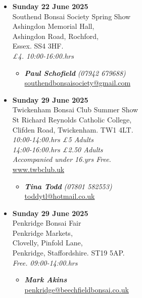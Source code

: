 \begin{itemize}
    \item \textbf{Sunday 22 June 2025}
    \\
    Southend Bonsai Society Spring Show \\
    Ashingdon Memorial Hall, \\
    Ashingdon Road, Rochford, \\
    Essex. SS4 3HF.
    \\
    \emph{£4. 10:00-16:00.hrs}
    \begin{itemize}
        \item \textbf{\emph{Paul Schofield}} \emph{(07942 679688)} \\
        \href{mailto:southendbonsaisociety@gmail.com}{southendbonsaisociety@gmail.com} 
    \end{itemize}

    \item \textbf{Sunday 29 June 2025}
    \\
    Twickenham Bonsai Club Summer Show \\
    St Richard Reynolds Catholic College, \\
    Clifden Road, Twickenham. TW1 4LT.
    \\
    \emph{10:00-14:00.hrs £5 Adults} \\
    \emph{14:00-16:00.hrs £2.50 Adults} \\
    \emph{Accompanied under 16.yrs Free.}
    \\
    \href{https://www.twbclub.uk}{www.twbclub.uk}
    \begin{itemize}
        \item \textbf{\emph{Tina Todd}} \emph{(07801 582553)} \\
        \href{mailto:toddytl@hotmail.co.uk}{toddytl@hotmail.co.uk} 
    \end{itemize}

    \item \textbf{Sunday 29 June 2025}
    \\
    Penkridge Bonsai Fair \\
    Penkridge Markets, \\
    Clovelly, Pinfold Lane, \\
    Penkridge, Staffordshire. ST19 5AP.
    \\
    \emph{Free. 09:00-14:00.hrs}
    \begin{itemize}
        \item \textbf{\emph{Mark Akins}} \\
        \href{mailto:penkridge@beechfieldbonsai.co.uk}{penkridge@beechfieldbonsai.co.uk} 
    \end{itemize}


\end{itemize}
